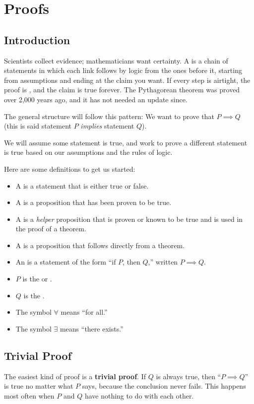 \chapter{Proofs}
\section{Introduction}


Scientists collect evidence; mathematicians want certainty. A  is a chain of statements in which each link follows by logic from the ones before it, starting from assumptions and ending at the claim you want. If every step is airtight, the proof is , and the claim is true forever. The Pythagorean theorem was proved over 2,000 years ago, and it has not needed an update since.

The general structure will follow this pattern:
We want to prove that $P \implies Q$ (this is said statement $P$ \textit{implies} statement $Q$).

We will assume some statement is true, and work to prove a different statement is true based on our assumptions and the rules of logic.

Here are some definitions to get us started:
\begin{itemize}
    \item A  is a statement that is either true or false.
    \item A  is a proposition that has been proven to be true.
    \item A  is a \textit{helper} proposition that is proven or known to be true and is used in the proof of a theorem.
    \item A  is a proposition that follows directly from a theorem.
    \item An  is a statement of the form ``if $P$, then $Q$,'' written $P \implies Q$.
    \item $P$ is the  or .
    \item $Q$ is the .
    \item The symbol $\forall$ means ``for all.''
    \item The symbol $\exists$ means ``there exists.''
\end{itemize}
\section{Trivial Proof}
The easiest kind of proof is a \textbf{trivial proof}. If $Q$ is always true, then ``$P \implies Q$'' is true no matter what $P$ says, because the conclusion never fails. This happens most often when $P$ and $Q$ have nothing to do with each other.

